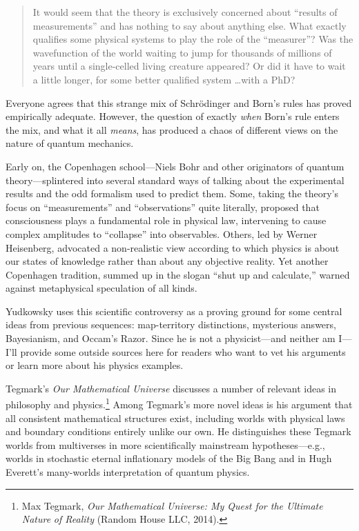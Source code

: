 \begin{quote}
{
 It would seem that the theory is exclusively concerned about
``results of measurements'' and has
nothing to say about anything else. What exactly qualifies some
physical systems to play the role of the
``measurer''? Was the wavefunction
of the world waiting to jump for thousands of millions of years until a
single-celled living creature appeared? Or did it have to wait a little
longer, for some better qualified system \ldots with a PhD?}
\end{quote}

{
 Everyone agrees that this strange mix of Schrödinger and
Born's rules has proved empirically adequate. However,
the question of exactly \textit{when} Born's rule
enters the mix, and what it all \textit{means}, has produced a chaos of
different views on the nature of quantum mechanics.}

{
 Early on, the Copenhagen school---Niels Bohr and other originators
of quantum theory---splintered into several standard ways of talking
about the experimental results and the odd formalism used to predict
them. Some, taking the theory's focus on
``measurements'' and
``observations'' quite literally,
proposed that consciousness plays a fundamental role in physical law,
intervening to cause complex amplitudes to
``collapse'' into observables.
Others, led by Werner Heisenberg, advocated a non-realistic view
according to which physics is about our states of knowledge rather than
about any objective reality. Yet another Copenhagen tradition, summed
up in the slogan ``shut up and
calculate,'' warned against metaphysical speculation
of all kinds.}

{
 Yudkowsky uses this scientific controversy as a proving ground for
some central ideas from previous sequences: map-territory distinctions,
mysterious answers, Bayesianism, and Occam's Razor.
Since he is not a physicist---and neither am I---I'll
provide some outside sources here for readers who want to vet his
arguments or learn more about his physics examples.}

{
 Tegmark's \textit{Our Mathematical Universe}
discusses a number of relevant ideas in philosophy and
physics.\footnote{Max Tegmark, \textit{Our Mathematical Universe: My Quest for
the Ultimate Nature }\textit{of Reality} (Random House LLC, 2014).} Among Tegmark's more novel
ideas is his argument that all consistent mathematical structures
exist, including worlds with physical laws and boundary conditions
entirely unlike our own. He distinguishes these Tegmark worlds from
multiverses in more scientifically mainstream hypotheses---e.g., worlds
in stochastic eternal inflationary models of the Big Bang and in Hugh
Everett's many-worlds interpretation of quantum
physics.}

